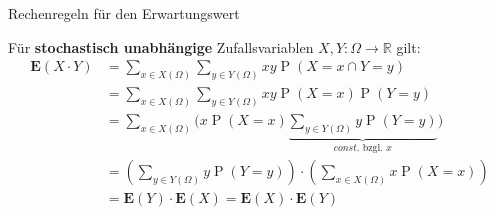 \documentclass[mathserif]{beamer}
\DeclareMathOperator{\Prob}{P}
\begin{document}
\begin{frame}{Rechenregeln für den Erwartungswert}
    \begin{outline}
        \1 Für \textbf{stochastisch unabhängige} Zufallsvariablen $X,Y:\Omega\longrightarrow\mathbb{R}$ gilt:\begin{align*}
            \mathbf{E}(X\cdot Y)&=\sum_{x\in X(\Omega)}\sum_{y\in Y(\Omega)}xy\Prob(X=x\cap Y=y)\\
            &=\sum_{x\in X(\Omega)}\sum_{y\in Y(\Omega)}xy\Prob(X=x)\Prob(Y=y)\\
            &=\sum_{x\in X(\Omega)}\Big(x\Prob(X=x)\underbrace{\sum_{y\in Y(\Omega)}y\Prob(Y=y)}_{const.\text{ bzgl. }x}\Big)\\
            &=\left(\sum_{y\in Y(\Omega)}y\Prob(Y=y)\right)\cdot\left(\sum_{x\in X(\Omega)}x\Prob(X=x)\right)\\
            &=\mathbf{E}(Y)\cdot\mathbf{E}(X)=\mathbf{E}(X)\cdot\mathbf{E}(Y)
        \end{align*}
    \end{outline}
\end{frame}
\end{document}
